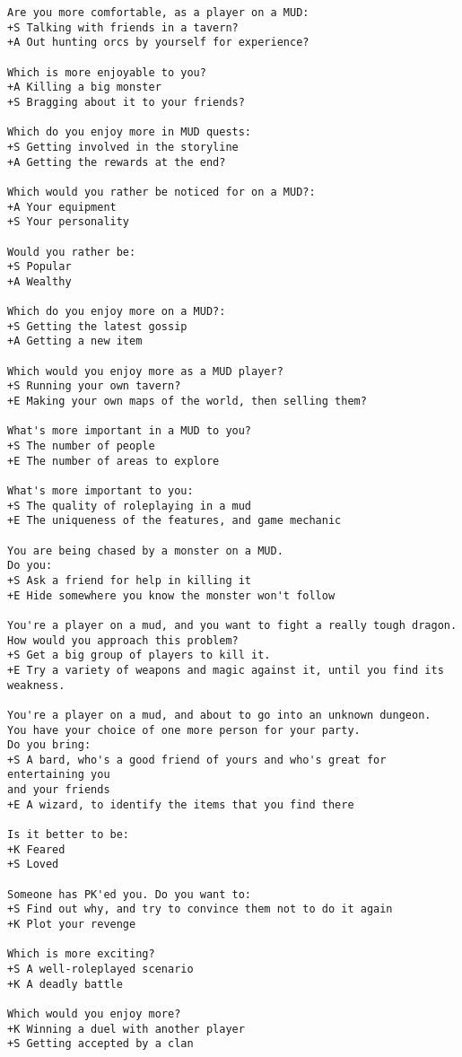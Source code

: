 \begin{verbatim}
Are you more comfortable, as a player on a MUD:
+S Talking with friends in a tavern?
+A Out hunting orcs by yourself for experience?

Which is more enjoyable to you?
+A Killing a big monster
+S Bragging about it to your friends?

Which do you enjoy more in MUD quests:
+S Getting involved in the storyline
+A Getting the rewards at the end?

Which would you rather be noticed for on a MUD?:
+A Your equipment
+S Your personality

Would you rather be:
+S Popular
+A Wealthy

Which do you enjoy more on a MUD?:
+S Getting the latest gossip
+A Getting a new item

Which would you enjoy more as a MUD player?
+S Running your own tavern?
+E Making your own maps of the world, then selling them?

What's more important in a MUD to you?
+S The number of people
+E The number of areas to explore

What's more important to you:
+S The quality of roleplaying in a mud
+E The uniqueness of the features, and game mechanic

You are being chased by a monster on a MUD.
Do you:
+S Ask a friend for help in killing it
+E Hide somewhere you know the monster won't follow

You're a player on a mud, and you want to fight a really tough dragon.
How would you approach this problem?
+S Get a big group of players to kill it.
+E Try a variety of weapons and magic against it, until you find its weakness.

You're a player on a mud, and about to go into an unknown dungeon.
You have your choice of one more person for your party.
Do you bring:
+S A bard, who's a good friend of yours and who's great for entertaining you 
and your friends
+E A wizard, to identify the items that you find there

Is it better to be:
+K Feared
+S Loved

Someone has PK'ed you. Do you want to:
+S Find out why, and try to convince them not to do it again
+K Plot your revenge

Which is more exciting?
+S A well-roleplayed scenario
+K A deadly battle

Which would you enjoy more?
+K Winning a duel with another player
+S Getting accepted by a clan


\end{verbatim}

